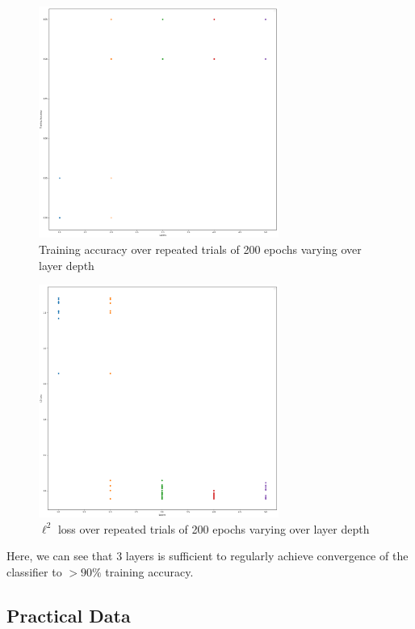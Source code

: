 \documentclass[main.tex]{subfiles}
\begin{document}
\begin{figure}[H]
\centering
\includegraphics[width=0.7\textwidth]{images/train_accs_layer_sep.png}	
\caption{Training accuracy over repeated trials of 200 epochs varying over layer depth}
\end{figure}

\begin{figure}[H]
\centering
\includegraphics[width=0.7\textwidth]{images/costs_layer_sep.png}	
\caption{$\ell^2$ loss over repeated trials of 200 epochs varying over layer depth}
\end{figure}

Here, we can see that 3 layers is sufficient to regularly achieve convergence of the classifier to $>90\%$ training accuracy. 

\subsection{Practical Data}
\end{document}
